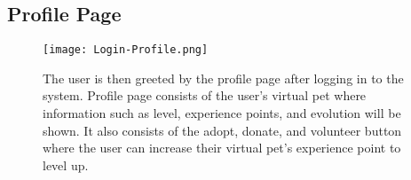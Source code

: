 \subsection{Profile Page}
\begin{figure}[H]                %
	\centering                    %
	\texttt{[image: Login-Profile.png]}      %
	\caption{
		The user is then greeted by the profile page after logging in to the system. Profile page consists of the user’s virtual pet where information such as level, experience points, and evolution will be shown. It also consists of the adopt, donate, and volunteer button where the user can increase their  virtual pet’s experience point to level up.}
	\label{fig:Login-Profile}
\end{figure}

